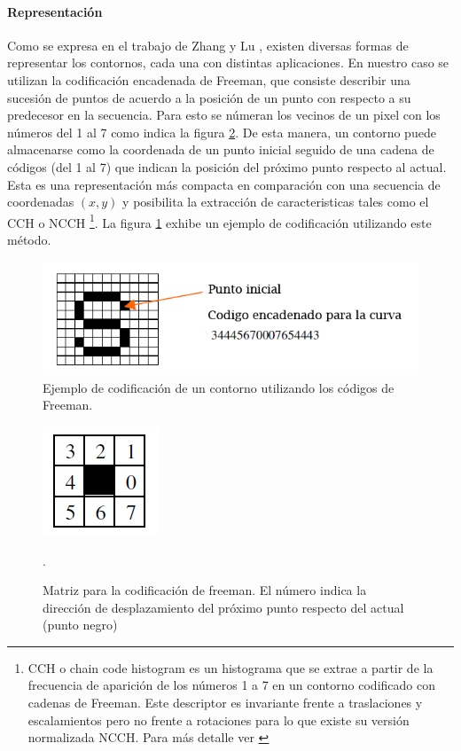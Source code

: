	\paragraph{Representación}
	Como se expresa en el trabajo de Zhang y Lu \cite{Zhang02}, existen diversas formas de representar los contornos, cada una con
	distintas aplicaciones. En nuestro caso se utilizan la codificación encadenada de Freeman, que consiste describir una sucesión de puntos
	de acuerdo a la posición de un punto con respecto a su predecesor en la secuencia. Para esto se númeran los vecinos de un pixel con 
	los números del 1 al 7 como indica la figura \ref{fig:freeman}. De esta manera, un contorno puede almacenarse como la coordenada de
	un punto inicial seguido de una cadena de códigos (del 1 al 7) que indican la posición del próximo punto respecto al actual. Esta 
	es una representación más compacta en comparación con una secuencia 
	de coordenadas  $(x,y)$ y posibilita la extracción de 
	caracteristicas tales como el CCH o NCCH \footnote{ CCH o chain 
	code histogram es un histograma que se extrae a partir de la 
	frecuencia de aparición de los números 1 a 7 en un contorno 
	codificado con cadenas de Freeman. Este descriptor es invariante 
	frente a traslaciones y escalamientos pero no frente a rotaciones 
	para lo que existe su versión normalizada NCCH. Para más detalle 
	ver \cite{Iivarinen96shaperecognition}}. La figura \ref{fig:freeman_sample} exhibe un 
	ejemplo de codificación utilizando este método.
	
	\begin{figure}[htpb]
\begin{center}
  \includegraphics[scale=0.6]{figuras/freeman-sample.png}
\end{center}	
  \caption{\small Ejemplo de codificación de un contorno utilizando los códigos de Freeman. }
  \label{fig:freeman_sample}
\end{figure}

\begin{figure}[htpb]
\begin{center}
  \includegraphics[scale=0.6]{figuras/freeman-codes.png}
\end{center}
  \caption{\small Matriz para la codificación de freeman. El número indica la dirección de desplazamiento del próximo punto respecto del
  actual (punto negro) }.
  \label{fig:freeman}
\end{figure}
		
